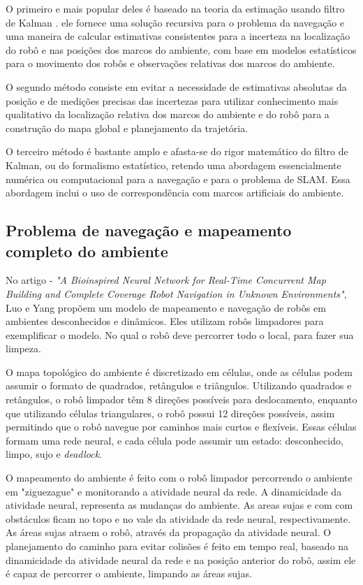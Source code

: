 \documentclass[12pt]{article}
\begin{document}
O primeiro e mais popular deles é baseado na teoria da estimação usando filtro de Kalman \cite{slam}. ele
fornece uma solução recursiva para o problema da navegação e uma maneira de calcular
estimativas consistentes para a incerteza na localização do robô e nas posições dos marcos do
ambiente, com base em modelos estatísticos para o movimento dos robôs e observações
relativas dos marcos do ambiente\cite{slam}.

O segundo método consiste em evitar a necessidade de estimativas absolutas da
posição e de medições precisas das incertezas para utilizar conhecimento mais qualitativo da
localização relativa dos marcos do ambiente e do robô para a construção do mapa global e
planejamento da trajetória\cite{construcaoMapas}.

O terceiro método é bastante amplo e afasta-se do rigor matemático do filtro de
Kalman, ou do formalismo estatístico, retendo uma abordagem essencialmente numérica ou
computacional para a navegação e para o problema de SLAM. Essa abordagem inclui o uso
de correspondência com marcos artificiais do ambiente\cite{construcaoMapas}.

\subsection{Problema de navegação e mapeamento completo do ambiente}
  No artigo \cite{cnn} - \textit{"A Bioinspired Neural Network for Real-Time Concurrent Map Building and Complete Coverage Robot Navigation in Unknown Environments"},
Luo e Yang propõem um modelo de mapeamento e navegação de robôs em ambientes desconhecidos e dinâmicos. Eles utilizam robôs limpadores para exemplificar o modelo. No 
qual o robô deve percorrer todo o local, para fazer sua limpeza.

  O mapa topológico do ambiente é discretizado em células, onde as células podem assumir o formato de quadrados, retângulos e triângulos. 
Utilizando quadrados e retângulos, o robô limpador têm 8 direções possíveis para deslocamento, enquanto que utilizando células triangulares, 
o robô possui 12 direções possíveis, assim permitindo que o robô navegue por caminhos mais curtos e flexíveis. 
Essas células formam uma rede neural, e cada célula pode assumir um estado: desconhecido, limpo, sujo e \textit{deadlock}. 

O mapeamento do ambiente é feito com o robô limpador percorrendo o ambiente em "ziguezague" e monitorando a atividade neural da rede.
A dinamicidade da atividade neural, representa as mudanças do ambiente. As areas sujas e com com obstáculos ficam no topo e no vale da atividade da rede neural, 
respectivamente. As áreas sujas atraem o robô, através da propagação da atividade neural. 
O planejamento do caminho para evitar colisões é feito em tempo real, baseado na dinamicidade da atividade neural da rede e na posição anterior do robô, assim ele 
é capaz de percorrer o ambiente, limpando as áreas sujas.
 
\end{document}
